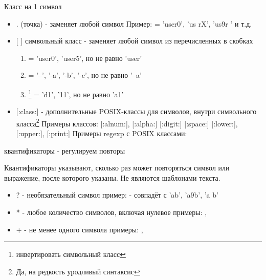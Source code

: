 \begin{frame}{Класс на 1 символ}
  \begin{itemize}
    \item \alert{.} (точка)  - заменяет любой символ \newline
      Пример:  = 'user0', 'us rX', 'us9r ' и т.д. \pause
    \item \alert{[ ]} символьный класс - заменяет любой символ из перечисленных в скобках
      \begin{enumerate}
        \item {} = 'user0', 'user5', но не равно 'user'
        \item \regex{-[abc-]} = '--', '-a', '-b', '-c', но не равно '--a'
        \item {}\footnote{инвертировать символьный класс} = 'd1', '11', но не равно 'a1'
      \end{enumerate} \pause
    \item \alert{[:class:]} - дополнительные POSIX-классы для символов, \alert{внутри символьного класса}\footnote{Да, на редкость уродливый синтаксис} \newline
        Примеры классов: \alert{[:alnum:]}, \alert{[:alpha:]} \alert{[:digit:]} \alert{[:space:]} \alert{[:lower:]}, \alert{[:upper:]}, \alert{[:print:]} \newline
        Примеры regexp с POSIX классами: \regex{[ы[:digit:]]}
  \end{itemize}
\end{frame}


\begin{frame}[fragile]{квантификаторы - регулируем повторы}

  \alert{Квантификаторы} указывают, сколько раз может повторяться символ или выражение, после которого указаны.  Не являются шаблонами текста.

  \begin{itemize}
    \item \alert{?} - необязательный символ \newline
      пример:  - совпадёт с 'ab', 'a9b', 'a b' \pause
    \item \alert{*} - любое количество символов, включая нулевое \newline
      примеры: , \regex{[[:digit:]]*} \pause
    \item \alert{+} - не менее одного символа \newline
      примеры: \regex{[a-d]+}, 
  \end{itemize}
\end{frame}
